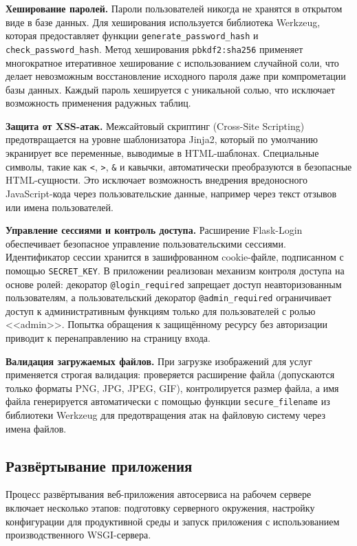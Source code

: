 \documentclass[14pt,a4paper,oneside]{extarticle}
\begin{document}
\textbf{Хеширование паролей.} Пароли пользователей никогда не хранятся в открытом виде в базе данных. Для хеширования используется библиотека Werkzeug, которая предоставляет функции \texttt{generate\_password\_hash} и \texttt{check\_password\_hash}. Метод хеширования \texttt{pbkdf2:sha256} применяет многократное итеративное хеширование с использованием случайной соли, что делает невозможным восстановление исходного пароля даже при компрометации базы данных. Каждый пароль хешируется с уникальной солью, что исключает возможность применения радужных таблиц.

\textbf{Защита от XSS-атак.} Межсайтовый скриптинг (Cross-Site Scripting) предотвращается на уровне шаблонизатора Jinja2, который по умолчанию экранирует все переменные, выводимые в HTML-шаблонах. Специальные символы, такие как \texttt{<}, \texttt{>}, \texttt{\&} и кавычки, автоматически преобразуются в безопасные HTML-сущности. Это исключает возможность внедрения вредоносного JavaScript-кода через пользовательские данные, например через текст отзывов или имена пользователей.

\textbf{Управление сессиями и контроль доступа.} Расширение Flask-Login обеспечивает безопасное управление пользовательскими сессиями. Идентификатор сессии хранится в зашифрованном cookie-файле, подписанном с помощью \texttt{SECRET\_KEY}. В приложении реализован механизм контроля доступа на основе ролей: декоратор \texttt{@login\_required} запрещает доступ неавторизованным пользователям, а пользовательский декоратор \texttt{@admin\_required} ограничивает доступ к административным функциям только для пользователей с ролью <<admin>>. Попытка обращения к защищённому ресурсу без авторизации приводит к перенаправлению на страницу входа.

\textbf{Валидация загружаемых файлов.} При загрузке изображений для услуг применяется строгая валидация: проверяется расширение файла (допускаются только форматы PNG, JPG, JPEG, GIF), контролируется размер файла, а имя файла генерируется автоматически с помощью функции \texttt{secure\_filename} из библиотеки Werkzeug для предотвращения атак на файловую систему через имена файлов.

\subsection{Развёртывание приложения}

Процесс развёртывания веб-приложения автосервиса на рабочем сервере включает несколько этапов: подготовку серверного окружения, настройку конфигурации для продуктивной среды и запуск приложения с использованием производственного WSGI-сервера.
\end{document}
